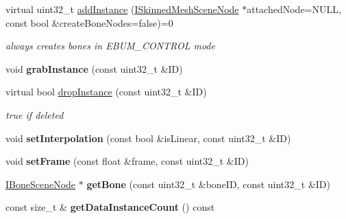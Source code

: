 \begin{DoxyCompactItemize}
\item 
virtual uint32\+\_\+t \hyperlink{classirr_1_1scene_1_1ISkinningStateManager_aec7fe2f2a583a3d3262f44777a27f135}{add\+Instance} (\hyperlink{classirr_1_1scene_1_1ISkinnedMeshSceneNode}{I\+Skinned\+Mesh\+Scene\+Node} $\ast$attached\+Node=N\+U\+LL, const bool \&create\+Bone\+Nodes=false)=0\hypertarget{classirr_1_1scene_1_1ISkinningStateManager_aec7fe2f2a583a3d3262f44777a27f135}{}\label{classirr_1_1scene_1_1ISkinningStateManager_aec7fe2f2a583a3d3262f44777a27f135}

\begin{DoxyCompactList}\small\item\em always creates bones in E\+B\+U\+M\+\_\+\+C\+O\+N\+T\+R\+OL mode \end{DoxyCompactList}\item 
void {\bfseries grab\+Instance} (const uint32\+\_\+t \&ID)\hypertarget{classirr_1_1scene_1_1ISkinningStateManager_a15fe70130aee56e22783bc2359415798}{}\label{classirr_1_1scene_1_1ISkinningStateManager_a15fe70130aee56e22783bc2359415798}

\item 
virtual bool \hyperlink{classirr_1_1scene_1_1ISkinningStateManager_a1d32269cebcb4d2ce8750463d5036355}{drop\+Instance} (const uint32\+\_\+t \&ID)\hypertarget{classirr_1_1scene_1_1ISkinningStateManager_a1d32269cebcb4d2ce8750463d5036355}{}\label{classirr_1_1scene_1_1ISkinningStateManager_a1d32269cebcb4d2ce8750463d5036355}

\begin{DoxyCompactList}\small\item\em true if deleted \end{DoxyCompactList}\item 
void {\bfseries set\+Interpolation} (const bool \&is\+Linear, const uint32\+\_\+t \&ID)\hypertarget{classirr_1_1scene_1_1ISkinningStateManager_af0bc1a6901ca195811ed3f8d31975e81}{}\label{classirr_1_1scene_1_1ISkinningStateManager_af0bc1a6901ca195811ed3f8d31975e81}

\item 
void {\bfseries set\+Frame} (const float \&frame, const uint32\+\_\+t \&ID)\hypertarget{classirr_1_1scene_1_1ISkinningStateManager_a76986dcfac7813ebdbf1e47afba42290}{}\label{classirr_1_1scene_1_1ISkinningStateManager_a76986dcfac7813ebdbf1e47afba42290}

\item 
\hyperlink{classirr_1_1scene_1_1ISkinningStateManager_1_1IBoneSceneNode}{I\+Bone\+Scene\+Node} $\ast$ {\bfseries get\+Bone} (const uint32\+\_\+t \&bone\+ID, const uint32\+\_\+t \&ID)\hypertarget{classirr_1_1scene_1_1ISkinningStateManager_aeb85bbf38a20c5f52c0abd9c25becc70}{}\label{classirr_1_1scene_1_1ISkinningStateManager_aeb85bbf38a20c5f52c0abd9c25becc70}

\item 
const size\+\_\+t \& {\bfseries get\+Data\+Instance\+Count} () const \hypertarget{classirr_1_1scene_1_1ISkinningStateManager_afaa0afdf8b21f72143e93fdf3e1ea9df}{}\label{classirr_1_1scene_1_1ISkinningStateManager_afaa0afdf8b21f72143e93fdf3e1ea9df}

\end{DoxyCompactItemize}
